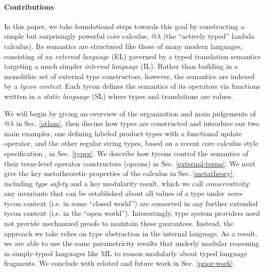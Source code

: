 \documentclass[10pt,preprint]{sigplanconf}
\begin{document}
\paragraph{Contributions} In this paper, we take foundational steps towards this goal by  constructing a simple but surprisingly powerful core calculus, @$\lambda$ (the ``actively typed'' lambda calculus). %
Its semantics are structured like those of many modern languages, consisting of an \emph{external language} (EL) governed by a {typed translation semantics} targeting a much simpler \emph{internal language} (IL). 
Rather than building in a monolithic set of external type constructors, however, the  semantics are indexed by a \emph{tycon context}. Each tycon defines the semantics of its operators via functions written in a \emph{static language} (SL) where types and translations are values. %

We will begin by giving an overview of the organization  and main judgements of @$\lambda$ in Sec. \ref{atlam}, then discuss how types are constructed and introduce our two main examples, one defining labeled product types with a functional update operator, and the other regular string types, based on a recent core calculus style specification \cite{sanitation-psp14}, in Sec. \ref{types}. We describe how tycons control the semantics of their term-level operator constructors (opcons) in Sec. \ref{external-terms}.  We next give the key metatheoretic properties of the calculus in Sec. \ref{metatheory}, including \emph{type safety} and a key modularity result, which we call  \emph{conservativity}: any invariants that can be established about all values of a type under \emph{some} tycon context (i.e. in some  ``closed world'') are conserved in any further extended tycon context (i.e. in the ``open world''). Interestingly, type system providers need not provide mechanized proofs to maintain these guarantees. Instead, the approach we take relies on type abstraction in the internal language. As a result, we are able to use the same parametricity results that underly modular reasoning in simply-typed languages like ML to reason modularly about typed language fragments. We conclude with  related and future work in Sec. \ref{prior-work}.
\end{document}
